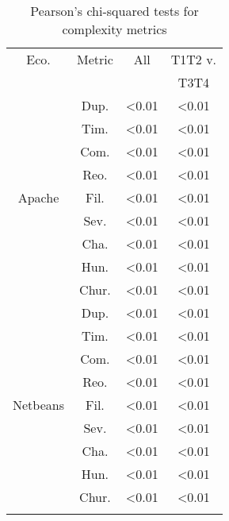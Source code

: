 
\begin{table}[]
\centering
\small
\caption{Pearson's chi-squared tests for complexity metrics}
\label{tab:chi-rq2}
\begin{tabular}{cccc}
Eco. & Metric & All & T1T2 v.  \\
          &        &  & T3T4  \\ \hline \rowcolor{gray!25}
          & Dup.   & \textless0.01         & \textless0.01         \\  \rowcolor{gray!25}
          & Tim.   & \textless0.01         & \textless0.01         \\  \rowcolor{gray!25}
          & Com.   & \textless0.01         & \textless0.01         \\  \rowcolor{gray!25}
          & Reo.   & \textless0.01         & \textless0.01         \\  \rowcolor{gray!25}
Apache    & Fil.   & \textless0.01         & \textless0.01         \\  \rowcolor{gray!25}
          & Sev.   & \textless0.01         & \textless0.01         \\  \rowcolor{gray!25}
          & Cha.   & \textless0.01         & \textless0.01         \\  \rowcolor{gray!25}
          & Hun.   & \textless0.01         & \textless0.01         \\  \rowcolor{gray!25}
          & Chur.  & \textless0.01         & \textless0.01         \\
          & Dup.   & \textless0.01         & \textless0.01         \\
          & Tim.   & \textless0.01         & \textless0.01         \\
          & Com.   & \textless0.01         & \textless0.01         \\
          & Reo.   & \textless0.01         & \textless0.01         \\
Netbeans  & Fil.   & \textless0.01         & \textless0.01         \\
          & Sev.   & \textless0.01         & \textless0.01         \\
          & Cha.   & \textless0.01         & \textless0.01         \\
          & Hun.   & \textless0.01         & \textless0.01         \\
          & Chur.  & \textless0.01         & \textless0.01         \\  \rowcolor{gray!25}

\end{tabular}
\end{table}
